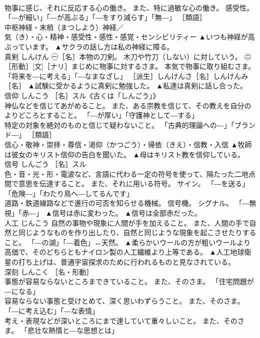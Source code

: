 \documentclass[8pt]{extreport}
\begin{document}
\begin{CJK}{UTF8}{min}
\\	物事に感じ、それに反応する心の働き。 また、特に過敏な心の働き。 感受性。 「―が細い」「―が高ぶる」「―をすり減らす」「無―」 ［類語］
\\	中枢神経・末梢（まつしよう）神経／
\\	気（き）・心・精神・感受性・感性・感覚・センシビリティー	▲いつも神経が高ぶっています。 ▲サクラの話し方は私の神経に障る。
\\	真剣	しんけん	㊀［名］本物の刀剣。 木刀や竹刀（しない）に対していう。 ㊁［形動］[文]［ナリ］まじめに物事に対するさま。 本気で物事に取り組むさま。 「将来を―に考える」「―なまなざし」 ［派生］しんけんさ［名］しんけんみ［名］	▲試験に受かるように真剣に勉強した。 ▲私達は真剣に話し合った。
\\	信仰	しんこう	［名］スル《古くは「しんごう」》 
\\	神仏などを信じてあがめること。 また、ある宗教を信じて、その教えを自分のよりどころとすること。 「―が厚い」「守護神として―する」 
\\	特定の対象を絶対のものと信じて疑わないこと。 「古典的理論への―」「ブランド―」 ［類語］
\\	信心・敬神・崇拝・尊信・渇仰（かつごう）・帰依（きえ）・信教・入信	▲牧師は彼女のキリスト信仰の告白を聞いた。 ▲母はキリスト教を信仰している。
\\	信号	しんごう	［名］スル 
\\	色・音・光・形・電波など、言語に代わる一定の符号を使って、隔たった二地点間で意思を伝達すること。 また、それに用いる符号。 サイン。 「―を送る」「危険―」「わたり鳥へ―してるんです」 
\\	道路・鉄道線路などで進行の可否を知らせる機械。 信号機。 シグナル。 「―無視」「赤―」	▲信号は赤に変わった。 ▲信号は全部赤だった。
\\	人工	じんこう	自然の事物や現象に人間が手を加えること。 また、人間の手で自然と同じようなものを作り出したり、自然と同じような現象を起こさせたりすること。 「―の湖」「―着色」↔天然。	▲柔らかいウールの方が粗いウールより高価で、そのどちらともナイロン製の人工繊維より上等である。 ▲人工地球衛星の打ち上げは、普通宇宙探求のために行われるものと見なされている。
\\	深刻	しんこく	［名・形動］ 
\\	事態が容易ならないところまできていること。 また、そのさま。 「住宅問題が―になる」 
\\	容易ならない事態と受けとめて、深く思いわずらうこと。 また、そのさま。 「―に考え込む」「―な表情」 
\\	考え・表現などが深いところにまで達していて重々しいこと。 また、そのさま。 「悲壮な熱情と―な思想とは」 

\end{CJK}
\end{document}
